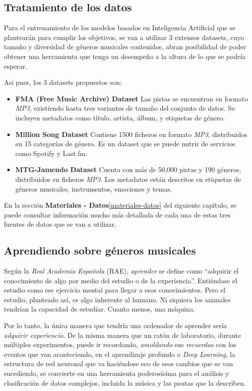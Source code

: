 \subsection{Tratamiento de los datos}
\label{tratamiento-datos}

Para el entrenamiento de los modelos basados en Inteligencia Artificial que se plantearán para cumplir los objetivos, se van a utilizar 3 extensos datasets, cuyo tamaño y diversidad de géneros musicales contenidos, abran posibilidad de poder obtener una herramienta que tenga un desempeño a la altura de lo que se podría esperar.

Asi pues, los 3 datasets propuestos son:

\begin{itemize}
    \item \textbf{FMA (Free Music Archive) Dataset}
        Las pistas se encuentran en formato \emph{MP3}, existiendo hasta tres variantes de tamaño del conjunto de datos.
        Se incluyen metadatos como título, artista, álbum, y etiquetas de género.
    \item \textbf{Million Song Dataset}
        Contiene 1500 ficheros en formato \emph{MP3}, distribuidos en 15 categorías de género. Es un dataset que se puede nutrir de servicios como Spotify y Last.fm.
    \item \textbf{MTG-Jamendo Dataset}
       Cuenta con más de 50,000 pistas y 190 géneros, distribuidos en ficheros \emph{MP3}. Los metadatos están descritos en etiquetas de géneros musicales, instrumentos, emociones y temas.
\end{itemize}
En la sección \textbf{Materiales - Datos}\ref{materiales-datos} del siguiente capítulo, se puede consultar información mucho más detallada de cada una de estas tres fuentes de datos que se van a utilizar.

\subsection{Aprendiendo sobre géneros musicales}

Según la \emph{Real Academia Española} (RAE), \emph{aprender} se define como ``adquirir el conocimiento de algo por medio del estudio o de la experiencia''\citep{rae_aprender}. Entiéndase el estudio como ese ejercicio mental para llegar a esos conocimientos. Pero el estudio, planteado así, es algo inherente al humano. Ni siquiera los animales tendrían la capacidad de estudiar. Cuanto menos, una máquina.

Por lo tanto, la única manera que tendría una ordenador de aprender sería \emph{adquirir experiencia}. De la misma manera que un ratón de laboratorio, durante múltiples experimentos, puede ir recordando, \emph{amoldando} sus \emph{recuerdos} con los eventos que van aconteciendo, en el aprendizaje profundo o \emph{Deep Learning}, la estructura de red neuronal que va haciéndose eco de esos cambios que se van sucediendo, se convierte en una herramienta poderosísima para el análisis y clasificación de datos complejos, incluida la música y las pautas que la describen. 

